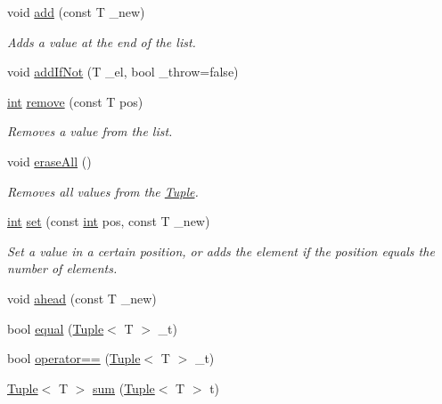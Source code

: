 \begin{DoxyCompactItemize}
\item 
void \mbox{\hyperlink{class_tuple_a5d3ee2809d790543195a6e2075aef7d0}{add}} (const T \+\_\+new)
\begin{DoxyCompactList}\small\item\em Adds a value at the end of the list. \end{DoxyCompactList}\item 
void \mbox{\hyperlink{class_tuple_ac7699d6813e11c18f436098e9f76ebf0}{add\+If\+Not}} (T \+\_\+el, bool \+\_\+throw=false)
\item 
\mbox{\hyperlink{draw_8hh_aa620a13339ac3a1177c86edc549fda9b}{int}} \mbox{\hyperlink{class_tuple_a53a1abc3017d30cf1a6d6858caee8ce8}{remove}} (const T pos)
\begin{DoxyCompactList}\small\item\em Removes a value from the list. \end{DoxyCompactList}\item 
void \mbox{\hyperlink{class_tuple_ae36c533bd6e97ac45a2ed69a0c4760e4}{erase\+All}} ()
\begin{DoxyCompactList}\small\item\em Removes all values from the {\ttfamily \mbox{\hyperlink{class_tuple}{Tuple}}}. \end{DoxyCompactList}\item 
\mbox{\hyperlink{draw_8hh_aa620a13339ac3a1177c86edc549fda9b}{int}} \mbox{\hyperlink{class_tuple_a6ecd34c0308891b7bec87b4736a6eaa5}{set}} (const \mbox{\hyperlink{draw_8hh_aa620a13339ac3a1177c86edc549fda9b}{int}} pos, const T \+\_\+new)
\begin{DoxyCompactList}\small\item\em Set a value in a certain position, or adds the element if the position equals the number of elements. \end{DoxyCompactList}\item 
void \mbox{\hyperlink{class_tuple_a1173bba1687b01721f9e4e4c73de0d2a}{ahead}} (const T \+\_\+new)
\item 
bool \mbox{\hyperlink{class_tuple_a68d1d3aaecc187f8f78b46f4e1b48260}{equal}} (\mbox{\hyperlink{class_tuple}{Tuple}}$<$ T $>$ \+\_\+t)
\item 
bool \mbox{\hyperlink{class_tuple_ad8f90a7c0726fae5ac5651c4e16222cd}{operator==}} (\mbox{\hyperlink{class_tuple}{Tuple}}$<$ T $>$ \+\_\+t)
\item 
\mbox{\hyperlink{class_tuple}{Tuple}}$<$ T $>$ \mbox{\hyperlink{class_tuple_a2b595ce33576c6fcb36d74b46f0a7c55}{sum}} (\mbox{\hyperlink{class_tuple}{Tuple}}$<$ T $>$ t)

\end{DoxyCompactItemize}

